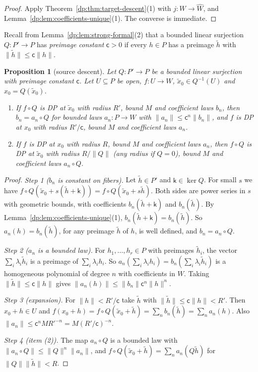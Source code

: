 \documentclass[11pt]{amsart}
\newtheorem{proposition}[theorem]{Proposition}
\theoremstyle{definition}
\theoremstyle{remark}
\numberwithin{equation}{section}
\newcommand{\norm}[1]{\lVert #1\rVert}
\theoremstyle{plain}
\theoremstyle{definition}
\theoremstyle{plain}
\begin{document}
\begin{proof}
Apply Theorem~\ref{dp:thm:target-descent}(1) with $j\colon W\to\widehat W$, and Lemma~\ref{dp:lem:coefficients-unique}(1). The converse is immediate.
\end{proof}

Recall from Lemma~\ref{dp:lem:strong-formal}(2) that a bounded linear surjection $Q\colon P'\to P$ has \emph{preimage constant} $\mathsf c>0$ if every $h\in P$ has a preimage $\tilde h$ with $\norm{\tilde h}\le\mathsf c\norm h$.

\begin{proposition}[source descent]\label{dp:prop:source-descent}
Let $Q\colon P'\to P$ be a bounded linear surjection with preimage constant $\mathsf c$. Let $U\subseteq P$ be open, $f\colon U\to W$, $\tilde x_0\in Q^{-1}(U)$ and $x_0=Q(\tilde x_0)$.
\begin{enumerate}
\item If $f\circ Q$ is DP at $\tilde x_0$ with radius $R'$, bound $M$ and coefficient laws $b_n$, then $b_n=a_n\circ Q$ for bounded laws $a_n\colon P\to W$ with $\norm{a_n}\le\mathsf c^n\norm{b_n}$, and $f$ is DP at $x_0$ with radius $R'/\mathsf c$, bound $M$ and coefficient laws $a_n$.
\item If $f$ is DP at $x_0$ with radius $R$, bound $M$ and coefficient laws $a_n$, then $f\circ Q$ is DP at $\tilde x_0$ with radius $R/\norm Q$ (any radius if $Q=0$), bound $M$ and coefficient laws $a_n\circ Q$.
\end{enumerate}
\end{proposition}

\begin{proof}
\emph{Step 1 ($b_n$ is constant on fibers).} Let $\tilde h\in P'$ and $\mathsf k\in\ker Q$. For small $s$ we have $f\circ Q(\tilde x_0+s(\tilde h+\mathsf k))=f\circ Q(\tilde x_0+s\tilde h)$. Both sides are power series in $s$ with geometric bounds, with coefficients $b_n(\tilde h+\mathsf k)$ and $b_n(\tilde h)$. By Lemma~\ref{dp:lem:coefficients-unique}(1), $b_n(\tilde h+\mathsf k)=b_n(\tilde h)$. So $a_n(h)=b_n(\tilde h)$, for any preimage $\tilde h$ of $h$, is well defined, and $b_n=a_n\circ Q$.

\emph{Step 2 ($a_n$ is a bounded law).} For $h_1,\dots,h_r\in P$ with preimages $\tilde h_i$, the vector $\sum_i\lambda_i\tilde h_i$ is a preimage of $\sum_i\lambda_ih_i$. So $a_n(\sum_i\lambda_ih_i)=b_n(\sum_i\lambda_i\tilde h_i)$ is a homogeneous polynomial of degree $n$ with coefficients in $W$. Taking $\norm{\tilde h}\le\mathsf c\norm h$ gives $\norm{a_n(h)}\le\norm{b_n}\mathsf c^n\norm h^n$.

\emph{Step 3 (expansion).} For $\norm h<R'/\mathsf c$ take $\tilde h$ with $\norm{\tilde h}\le\mathsf c\norm h<R'$. Then $x_0+h\in U$ and $f(x_0+h)=f\circ Q(\tilde x_0+\tilde h)=\sum_nb_n(\tilde h)=\sum_na_n(h)$. Also $\norm{a_n}\le\mathsf c^nMR'^{-n}=M(R'/\mathsf c)^{-n}$.

\emph{Step 4 (item (2)).} The map $a_n\circ Q$ is a bounded law with $\norm{a_n\circ Q}\le\norm Q^n\norm{a_n}$, and $f\circ Q(\tilde x_0+\tilde h)=\sum_na_n(Q\tilde h)$ for $\norm Q\norm{\tilde h}<R$.
\end{proof}
\end{document}
